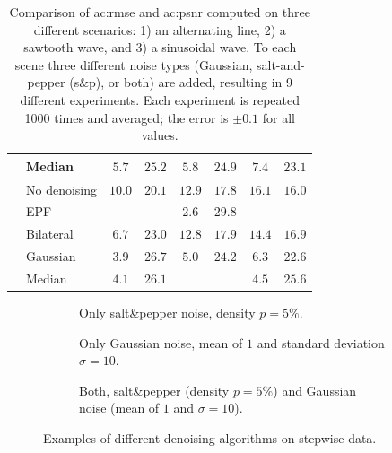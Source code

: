 \begin{table}[]
\begin{tabular}{c l cc|cc|cc}
    &Median       &  $5.7$        & $25.2$        &  $5.8$        & $24.9$        &  $7.4$        & $23.1$        \\
    \midrule
     & No denoising & $10.0$        & $20.1$        & $12.9$        & $17.8$        & $16.1$        & $16.0$        \\
    &EPF          &     &    &  $2.6$        & $29.8$        &     &    \\
    &Bilateral    & $6.7$         & $23.0$        & $12.8$        & $17.9$        & $14.4$        & $16.9$        \\
    &Gaussian     & $3.9$         & $26.7$        &  $5.0$        & $24.2$        &  $6.3$        & $22.6$        \\
    &Median       & $4.1$         & $26.1$        &     &    &  $4.5$        & $25.6$        \\
    \bottomrule
  \end{tabular}
  \caption{Comparison of \gls{ac:rmse} and \gls{ac:psnr} computed on three different scenarios: 1) an alternating line, 2) a sawtooth wave, and 3) a sinusoidal wave. To each scene three different noise types (Gaussian, salt-and-pepper (s\&p), or both) are added, resulting in 9 different experiments. Each experiment is repeated 1000 times and averaged; the error is $\pm 0.1$ for all values.}
  \label{tab:experiments_1d_rmsepsnr}
\end{table}

\begin{figure}[]
  \centering
  \begin{subfigure}[]{\textwidth}
    \centering
    
    \caption{Only salt\&pepper noise, density $p = 5\%$.}
  \end{subfigure}
  \begin{subfigure}[]{\textwidth}
    \centering
    
    \caption{Only Gaussian noise, mean of $1$ and standard deviation $\sigma = 10$.}
  \end{subfigure}
  \begin{subfigure}[]{\textwidth}
    \centering
    
    \caption{Both, salt\&pepper (density $p = 5\%$) and Gaussian noise (mean of $1$ and $\sigma = 10$).}
  \end{subfigure}
  \caption{Examples of different denoising algorithms on stepwise data.}
  \label{fig:sensor_experiments_1d_altline}
\end{figure}

